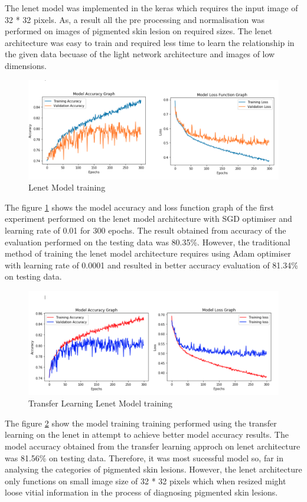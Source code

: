The lenet model was implemented in the keras which requires the input image of 32 * 32 pixels. As, a result 
all the pre processing and normalisation was performed on images of pigmented skin lesion on required sizes.
The lenet architecture was easy to train and required less time to learn the relationship in the given data becuase 
of the light network architecture and images of low dimensions.

\begin{figure}[!htp]
    \includegraphics[width=\textwidth]{Images/lenetarc.png}
    \caption{Lenet Model training}
    \label{fig:llenet}
\end{figure}

The figure \ref{fig:llenet} shows the model accuracy and loss function graph of the first experiment 
performed on the lenet model architecture with SGD optimiser and learning rate of 0.01 for 300 epochs. 
The result obtained from accuracy of the evaluation performed on the testing data was 80.35\%.
However, the traditional method of training the lenet model architecture requires using 
Adam optimiser with learning rate of 0.0001 and resulted in better accuracy evaluation of 81.34\% on testing data.

\begin{figure}[!htp]
    \includegraphics[width=\textwidth]{Images/lenet22.png}
    \caption{Transfer Learning Lenet Model training}
    \label{fig:lenet22}
\end{figure}

The figure \ref{fig:lenet22} show the model training training performed using the transfer learning on the 
lenet in attempt to achieve better model accuracy results. The model accuracy obtained from the transfer learning approch on 
lenet architecture was 81.56\% on testing data. Therefore, it was most sucessful model so, far in analysing the 
categories of pigmented skin lesions. However, the lenet architecture only functions on small image size of 
32 * 32 pixels which when resized might loose vitial information in the process of diagnosing pigmented skin lesions.
